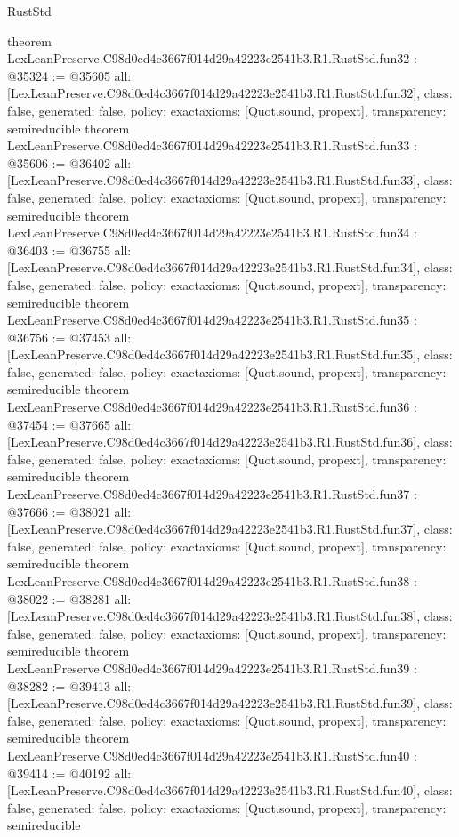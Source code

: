 \begin{lexlean}{RustStd}
\begin{coremodule}
{}
theorem LexLeanPreserve.C98d0ed4c3667f014d29a42223e2541b3.R1.RustStd.fun32 : @35324 := @35605 {
  all: [LexLeanPreserve.C98d0ed4c3667f014d29a42223e2541b3.R1.RustStd.fun32],
  class: false,
  generated: false,
  policy: exact{axioms: [Quot.sound, propext]},
  transparency: semireducible
}
theorem LexLeanPreserve.C98d0ed4c3667f014d29a42223e2541b3.R1.RustStd.fun33 : @35606 := @36402 {
  all: [LexLeanPreserve.C98d0ed4c3667f014d29a42223e2541b3.R1.RustStd.fun33],
  class: false,
  generated: false,
  policy: exact{axioms: [Quot.sound, propext]},
  transparency: semireducible
}
theorem LexLeanPreserve.C98d0ed4c3667f014d29a42223e2541b3.R1.RustStd.fun34 : @36403 := @36755 {
  all: [LexLeanPreserve.C98d0ed4c3667f014d29a42223e2541b3.R1.RustStd.fun34],
  class: false,
  generated: false,
  policy: exact{axioms: [Quot.sound, propext]},
  transparency: semireducible
}
theorem LexLeanPreserve.C98d0ed4c3667f014d29a42223e2541b3.R1.RustStd.fun35 : @36756 := @37453 {
  all: [LexLeanPreserve.C98d0ed4c3667f014d29a42223e2541b3.R1.RustStd.fun35],
  class: false,
  generated: false,
  policy: exact{axioms: [Quot.sound, propext]},
  transparency: semireducible
}
theorem LexLeanPreserve.C98d0ed4c3667f014d29a42223e2541b3.R1.RustStd.fun36 : @37454 := @37665 {
  all: [LexLeanPreserve.C98d0ed4c3667f014d29a42223e2541b3.R1.RustStd.fun36],
  class: false,
  generated: false,
  policy: exact{axioms: [Quot.sound, propext]},
  transparency: semireducible
}
theorem LexLeanPreserve.C98d0ed4c3667f014d29a42223e2541b3.R1.RustStd.fun37 : @37666 := @38021 {
  all: [LexLeanPreserve.C98d0ed4c3667f014d29a42223e2541b3.R1.RustStd.fun37],
  class: false,
  generated: false,
  policy: exact{axioms: [Quot.sound, propext]},
  transparency: semireducible
}
theorem LexLeanPreserve.C98d0ed4c3667f014d29a42223e2541b3.R1.RustStd.fun38 : @38022 := @38281 {
  all: [LexLeanPreserve.C98d0ed4c3667f014d29a42223e2541b3.R1.RustStd.fun38],
  class: false,
  generated: false,
  policy: exact{axioms: [Quot.sound, propext]},
  transparency: semireducible
}
theorem LexLeanPreserve.C98d0ed4c3667f014d29a42223e2541b3.R1.RustStd.fun39 : @38282 := @39413 {
  all: [LexLeanPreserve.C98d0ed4c3667f014d29a42223e2541b3.R1.RustStd.fun39],
  class: false,
  generated: false,
  policy: exact{axioms: [Quot.sound, propext]},
  transparency: semireducible
}
theorem LexLeanPreserve.C98d0ed4c3667f014d29a42223e2541b3.R1.RustStd.fun40 : @39414 := @40192 {
  all: [LexLeanPreserve.C98d0ed4c3667f014d29a42223e2541b3.R1.RustStd.fun40],
  class: false,
  generated: false,
  policy: exact{axioms: [Quot.sound, propext]},
  transparency: semireducible
}
\end{coremodule}
\end{lexlean}
